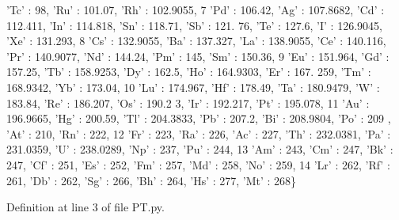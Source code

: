 \begin{DoxyCode}
{      'Tc'} : 98, \textcolor{stringliteral}{'Ru'} : 101.07, \textcolor{stringliteral}{'Rh'} : 102.9055, 
7                  \textcolor{stringliteral}{'Pd'} : 106.42, \textcolor{stringliteral}{'Ag'} : 107.8682, \textcolor{stringliteral}{'Cd'} : 112.411, \textcolor{stringliteral}{'In'} : 114.818, \textcolor{stringliteral}{'Sn'} : 118.71, \textcolor{stringliteral}{'Sb'} : 121.
      76, \textcolor{stringliteral}{'Te'} : 127.6, \textcolor{stringliteral}{'I'} : 126.9045, \textcolor{stringliteral}{'Xe'} : 131.293, 
8                  \textcolor{stringliteral}{'Cs'} : 132.9055, \textcolor{stringliteral}{'Ba'} : 137.327, \textcolor{stringliteral}{'La'} : 138.9055, \textcolor{stringliteral}{'Ce'} : 140.116, \textcolor{stringliteral}{'Pr'} : 140.9077, \textcolor{stringliteral}{'Nd'} : 
      144.24, \textcolor{stringliteral}{'Pm'} : 145, \textcolor{stringliteral}{'Sm'} : 150.36, 
9                  \textcolor{stringliteral}{'Eu'} : 151.964, \textcolor{stringliteral}{'Gd'} : 157.25, \textcolor{stringliteral}{'Tb'} : 158.9253, \textcolor{stringliteral}{'Dy'} : 162.5, \textcolor{stringliteral}{'Ho'} : 164.9303, \textcolor{stringliteral}{'Er'} : 167.
      259, \textcolor{stringliteral}{'Tm'} : 168.9342, \textcolor{stringliteral}{'Yb'} : 173.04, 
10                  \textcolor{stringliteral}{'Lu'} : 174.967, \textcolor{stringliteral}{'Hf'} : 178.49, \textcolor{stringliteral}{'Ta'} : 180.9479, \textcolor{stringliteral}{'W'} : 183.84, \textcolor{stringliteral}{'Re'} : 186.207, \textcolor{stringliteral}{'Os'} : 190.2
      3, \textcolor{stringliteral}{'Ir'} : 192.217, \textcolor{stringliteral}{'Pt'} : 195.078, 
11                  \textcolor{stringliteral}{'Au'} : 196.9665, \textcolor{stringliteral}{'Hg'} : 200.59, \textcolor{stringliteral}{'Tl'} : 204.3833, \textcolor{stringliteral}{'Pb'} : 207.2, \textcolor{stringliteral}{'Bi'} : 208.9804, \textcolor{stringliteral}{'Po'} : 209
      , \textcolor{stringliteral}{'At'} : 210, \textcolor{stringliteral}{'Rn'} : 222, 
12                  \textcolor{stringliteral}{'Fr'} : 223, \textcolor{stringliteral}{'Ra'} : 226, \textcolor{stringliteral}{'Ac'} : 227, \textcolor{stringliteral}{'Th'} : 232.0381, \textcolor{stringliteral}{'Pa'} : 231.0359, \textcolor{stringliteral}{'}\textcolor{stringliteral}{U' : 238.0289, '}Np'
       : 237, 'Pu' : 244, 
13                  \textcolor{stringliteral}{'Am'} : 243, \textcolor{stringliteral}{'Cm'} : 247, \textcolor{stringliteral}{'Bk'} : 247, \textcolor{stringliteral}{'Cf'} : 251, \textcolor{stringliteral}{'Es'} : 252, \textcolor{stringliteral}{'Fm'} : 257, \textcolor{stringliteral}{'Md'} : 258, \textcolor{stringliteral}{'No'} :
       259, 
14                  \textcolor{stringliteral}{'Lr'} : 262, \textcolor{stringliteral}{'Rf'} : 261, \textcolor{stringliteral}{'Db'} : 262, \textcolor{stringliteral}{'Sg'} : 266, \textcolor{stringliteral}{'Bh'} : 264, \textcolor{stringliteral}{'Hs'} : 277, \textcolor{stringliteral}{'Mt'} : 268\}
\end{DoxyCode}


Definition at line 3 of file P\-T.\-py.

